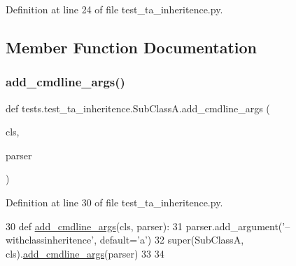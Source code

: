 Definition at line 24 of file test\+\_\+ta\+\_\+inheritence.\+py.



\subsection{Member Function Documentation}
\mbox{\label{classtests_1_1test__ta__inheritence_1_1SubClassA_a088369e91c8005b70d20f17032998215}} 
\subsubsection{\texorpdfstring{add\+\_\+cmdline\+\_\+args()}{add\_cmdline\_args()}}
{\footnotesize\ttfamily def tests.\+test\+\_\+ta\+\_\+inheritence.\+Sub\+Class\+A.\+add\+\_\+cmdline\+\_\+args (\begin{DoxyParamCaption}\item[{}]{cls,  }\item[{}]{parser }\end{DoxyParamCaption})}



Definition at line 30 of file test\+\_\+ta\+\_\+inheritence.\+py.


\begin{DoxyCode}
30     \textcolor{keyword}{def }\hyperlink{namespaceparlai_1_1agents_1_1drqa_1_1config_a62fdd5554f1da6be0cba185271058320}{add\_cmdline\_args}(cls, parser):
31         parser.add\_argument(\textcolor{stringliteral}{'--withclassinheritence'}, default=\textcolor{stringliteral}{'a'})
32         super(SubClassA, cls).\hyperlink{namespaceparlai_1_1agents_1_1drqa_1_1config_a62fdd5554f1da6be0cba185271058320}{add\_cmdline\_args}(parser)
33 
34 
\end{DoxyCode}
\mbox{\label{classtests_1_1test__ta__inheritence_1_1SubClassA_aa01b5f43121b539c377b9b1d50f93d0c}} 
